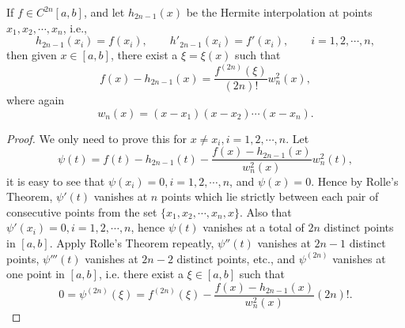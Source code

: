 \begin{lemma} \label{L:hermite}
If $f\in C^{2n}[a,b]$, and let $h_{2n-1}(x)$ be the Hermite interpolation at
points $x_1,x_2,\cdots,x_n$, i.e.,
\[
  h_{2n-1}(x_i)=f(x_i), \qquad h'_{2n-1}(x_i)=f'(x_i), \qquad i=1,2,\cdots,n,
\]
then given $x\in[a,b]$, there exist a $\xi=\xi(x)$ such that
\begin{equation}
  f(x) - h_{2n-1}(x) = \frac{f^{(2n)}(\xi)}{(2n)!} w_n^2(x),
\end{equation}
where again
\[
  w_n(x) = (x-x_1)(x-x_2) \cdots (x-x_n).
\]
\end{lemma}
\begin{proof}
We only need to prove this for $x\neq x_i, i=1,2,\cdots,n$. Let
\[
  \psi(t) = f(t) - h_{2n-1}(t) - \frac{ f(x)-h_{2n-1}(x) }{ w_n^2(x) } w_n^2(t),
\]
it is easy to see that $\psi(x_i)=0,i=1,2,\cdots,n$, and $\psi(x)=0$.
Hence by Rolle's Theorem, $\psi'(t)$ vanishes at $n$ points which lie strictly
between each pair of consecutive points from the set $\{x_1,x_2,\cdots,x_n,x\}$.
Also that $\psi'(x_i)=0,i=1,2,\cdots,n$, hence $\psi(t)$ vanishes at a total of
$2n$ distinct points in $[a,b]$. Apply Rolle's Theorem repeatly, 
$\psi''(t)$ vanishes at $2n-1$ distinct points, $\psi'''(t)$ vanishes at $2n-2$
distinct points, etc., and $\psi^{(2n)}$ vanishes at one point in $[a,b]$, i.e.
there exist a $\xi\in[a,b]$ such that
\[
  0=\psi^{(2n)}(\xi) = f^{(2n)}(\xi) - \frac{f(x)-h_{2n-1}(x)}{w_n^2(x)} (2n)!.
\]
\end{proof}

